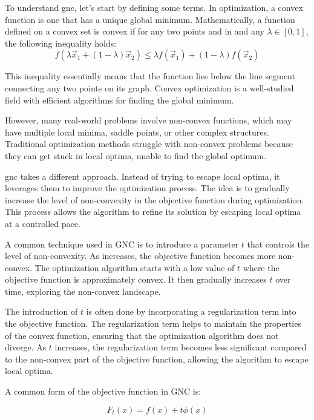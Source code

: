 To understand \gls{gnc}, let's start by defining some terms. In optimization, a convex function is one that has a unique global minimum. Mathematically, a function  defined on a convex set  is convex if for any two points  and  in  and any $\lambda \in [0,1]$, the following inequality holds:
\begin{equation}
	f(\lambda \vec{x}_1 + (1-\lambda)\vec{x}_2) \leq \lambda f(\vec{x}_1) + (1-\lambda)f(\vec{x}_2)
\end{equation}

This inequality essentially means that the function lies below the line segment connecting any two points on its graph. Convex optimization is a well-studied field with efficient algorithms for finding the global minimum.

However, many real-world problems involve non-convex functions, which may have multiple local minima, saddle points, or other complex structures. Traditional optimization methods struggle with non-convex problems because they can get stuck in local optima, unable to find the global optimum.

\gls{gnc} takes a different approach. Instead of trying to escape local optima, it leverages them to improve the optimization process. The idea is to gradually increase the level of non-convexity in the objective function during optimization. This process allows the algorithm to refine its solution by escaping local optima at a controlled pace.

A common technique used in GNC is to introduce a parameter $t$ that controls the level of non-convexity. As  increases, the objective function becomes more non-convex. The optimization algorithm starts with a low value of $t$ where the objective function is approximately convex. It then gradually increases $t$ over time, exploring the non-convex landscape.

The introduction of $t$ is often done by incorporating a regularization term into the objective function. The regularization term helps to maintain the properties of the convex function, ensuring that the optimization algorithm does not diverge. As $t$ increases, the regularization term becomes less significant compared to the non-convex part of the objective function, allowing the algorithm to escape local optima.

A common form of the objective function in GNC is:

\begin{equation}
	F_t(x) = f(x) + t\phi(x)
\end{equation}

